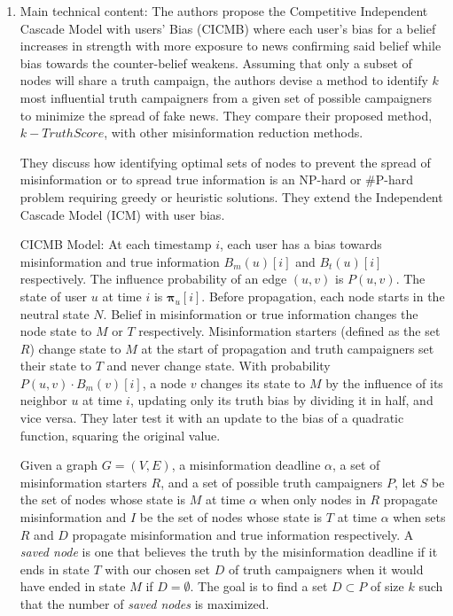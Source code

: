 \documentclass[11pt]{article}
\begin{document}
\begin{enumerate}
    \item Main technical content: The authors propose the Competitive Independent Cascade Model with users' Bias (CICMB) where each user's bias for a belief increases in strength with more exposure to news confirming said belief while bias towards the counter-belief weakens. Assuming that only a subset of nodes will share a truth campaign, the authors devise a method to identify $k$ most influential truth campaigners from a given set of possible campaigners to minimize the spread of fake news. They compare their proposed method, $k-TruthScore$, with other misinformation reduction methods.

    They discuss how identifying optimal sets of nodes to prevent the spread of misinformation or to spread true information is an NP-hard or \#P-hard problem requiring greedy or heuristic solutions. They extend the Independent Cascade Model (ICM) with user bias.

    CICMB Model: At each timestamp $i$, each user has a bias towards misinformation and true information $B_m(u)[i]$ and $B_t(u)[i]$ respectively. The influence probability of an edge $(u,v)$ is $P(u,v)$. The state of user $u$ at time $i$ is $\boldsymbol{\pi}_u[i]$. Before propagation, each node starts in the neutral state $N$. Belief in misinformation or true information changes the node state to $M$ or $T$ respectively. Misinformation starters (defined as the set $R$) change state to $M$ at the start of propagation and truth campaigners set their state to $T$ and never change state. With probability $P(u,v)\cdot B_m(v)[i]$, a node $v$ changes its state to $M$ by the influence of its neighbor $u$ at time $i$, updating only its truth bias by dividing it in half, and vice versa. They later test it with an update to the bias of a quadratic function, squaring the original value.

    Given a graph $G=(V,E)$, a misinformation deadline $\alpha$, a set of misinformation starters $R$, and a set of possible truth campaigners $P$, let $S$ be the set of nodes whose state is $M$ at time $\alpha$ when only nodes in $R$ propagate misinformation and $I$ be the set of nodes whose state is $T$ at time $\alpha$ when sets $R$ and $D$ propagate misinformation and true information respectively. A \textit{saved node} is one that believes the truth by the misinformation deadline if it ends in state $T$ with our chosen set $D$ of truth campaigners when it would have ended in state $M$ if $D=\emptyset$. The goal is to find a set $D\subset P$ of size $k$ such that the number of \textit{saved nodes} is maximized.


\end{enumerate}
\end{document}
